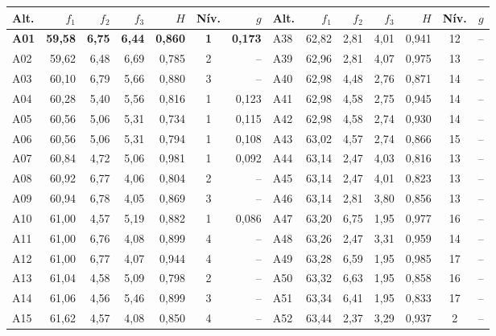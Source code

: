 \begin{tabular}{l r r r r c r @{\hspace{1.2em}} l r r r r c r}
\toprule
\textbf{Alt.} & \textbf{$f_1$} & \textbf{$f_2$} & \textbf{$f_3$} & \textbf{$H$} & \textbf{Nív.} & \textbf{$g$} & \textbf{Alt.} & \textbf{$f_1$} & \textbf{$f_2$} & \textbf{$f_3$} & \textbf{$H$} & \textbf{Nív.} & \textbf{$g$} \\
\midrule
\textbf{A01} & \textbf{59{,}58} & \textbf{6{,}75} & \textbf{6{,}44} & \textbf{0{,}860} & \textbf{1} & \textbf{0{,}173} & A38 & 62{,}82 & 2{,}81 & 4{,}01 & 0{,}941 & 12 & -- \\
A02 & 59{,}62 & 6{,}48 & 6{,}69 & 0{,}785 & 2 & -- & A39 & 62{,}96 & 2{,}81 & 4{,}07 & 0{,}975 & 13 & -- \\
A03 & 60{,}10 & 6{,}79 & 5{,}66 & 0{,}880 & 3 & -- & A40 & 62{,}98 & 4{,}48 & 2{,}76 & 0{,}871 & 14 & -- \\
A04 & 60{,}28 & 5{,}40 & 5{,}56 & 0{,}816 & 1 & 0{,}123 & A41 & 62{,}98 & 4{,}58 & 2{,}75 & 0{,}945 & 14 & -- \\
A05 & 60{,}56 & 5{,}06 & 5{,}31 & 0{,}734 & 1 & 0{,}115 & A42 & 62{,}98 & 4{,}58 & 2{,}74 & 0{,}930 & 14 & -- \\
A06 & 60{,}56 & 5{,}06 & 5{,}31 & 0{,}794 & 1 & 0{,}108 & A43 & 63{,}02 & 4{,}57 & 2{,}74 & 0{,}866 & 15 & -- \\
A07 & 60{,}84 & 4{,}72 & 5{,}06 & 0{,}981 & 1 & 0{,}092 & A44 & 63{,}14 & 2{,}47 & 4{,}03 & 0{,}816 & 13 & -- \\
A08 & 60{,}92 & 6{,}77 & 4{,}06 & 0{,}804 & 2 & -- & A45 & 63{,}14 & 2{,}47 & 4{,}01 & 0{,}823 & 13 & -- \\
A09 & 60{,}94 & 6{,}78 & 4{,}05 & 0{,}869 & 3 & -- & A46 & 63{,}14 & 2{,}81 & 3{,}80 & 0{,}856 & 13 & -- \\
A10 & 61{,}00 & 4{,}57 & 5{,}19 & 0{,}882 & 1 & 0{,}086 & A47 & 63{,}20 & 6{,}75 & 1{,}95 & 0{,}977 & 16 & -- \\
A11 & 61{,}00 & 6{,}76 & 4{,}08 & 0{,}899 & 4 & -- & A48 & 63{,}26 & 2{,}47 & 3{,}31 & 0{,}959 & 14 & -- \\
A12 & 61{,}00 & 6{,}77 & 4{,}07 & 0{,}944 & 4 & -- & A49 & 63{,}28 & 6{,}59 & 1{,}95 & 0{,}985 & 17 & -- \\
A13 & 61{,}04 & 4{,}58 & 5{,}09 & 0{,}798 & 2 & -- & A50 & 63{,}32 & 6{,}63 & 1{,}95 & 0{,}858 & 16 & -- \\
A14 & 61{,}06 & 4{,}56 & 5{,}46 & 0{,}899 & 3 & -- & A51 & 63{,}34 & 6{,}41 & 1{,}95 & 0{,}833 & 17 & -- \\
A15 & 61{,}62 & 4{,}57 & 4{,}08 & 0{,}850 & 4 & -- & A52 & 63{,}44 & 2{,}37 & 3{,}29 & 0{,}937 & 2 & -- \\

\end{tabular}
